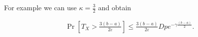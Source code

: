 \documentclass[12pt, a4paper]{article}
\theoremstyle{remark}
\theoremstyle{definition}
\begin{document}
For example we can use $\kappa = \frac{3}{2}$ and obtain

\begin{align*}
    \Pr\left[T_X > \frac{3 (b - a)}{2\varepsilon}\right] \leq \frac{3(b - a)}{2\varepsilon} D p e^{-\gamma\frac{(b - a)}{2}}.
\end{align*}














\end{document}
